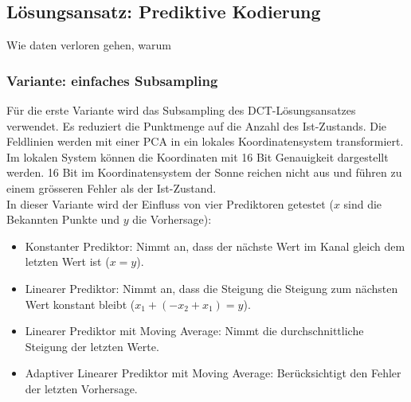 \subsection{Lösungsansatz: Prediktive Kodierung}
Wie daten verloren gehen, warum 

\subsubsection{Variante: einfaches Subsampling}
Für die erste Variante wird das Subsampling des DCT-Lösungsansatzes verwendet. Es reduziert die Punktmenge auf die Anzahl des Ist-Zustands. Die Feldlinien werden mit einer PCA in ein lokales Koordinatensystem transformiert. Im lokalen System können die Koordinaten mit 16 Bit Genauigkeit dargestellt werden. 16 Bit im Koordinatensystem der Sonne reichen nicht aus und führen zu einem grösseren Fehler als der Ist-Zustand.\\
In dieser Variante wird der Einfluss von vier Prediktoren getestet ($x$ sind die Bekannten Punkte und $y$ die Vorhersage):
\begin{itemize}
\item Konstanter Prediktor: Nimmt an, dass der nächste Wert im Kanal gleich dem  letzten Wert ist ($x = y$).
\item Linearer Prediktor: Nimmt an, dass die Steigung die Steigung zum nächsten Wert konstant bleibt ($x_1+(-x_2+x_1) = y$).
\item Linearer Prediktor mit Moving Average: Nimmt die durchschnittliche Steigung der letzten Werte.
\item Adaptiver Linearer Prediktor mit Moving Average: Berücksichtigt den Fehler der letzten Vorhersage.
\end{itemize}

